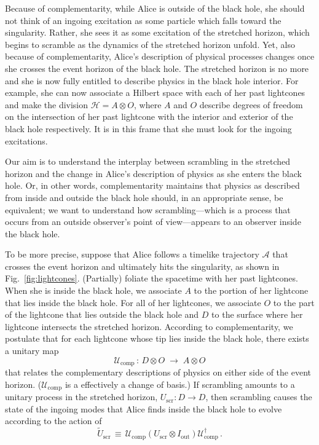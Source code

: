 \documentclass[a4paper,11pt]{article}
\newcommand{\hil}{\mathcal{H}}
\theoremstyle{definition}
\newcommand{\Fig}[1]{Fig.~\ref{#1}}
\begin{document}
Because of complementarity, while Alice is outside of the black hole, she should not think of an ingoing excitation as some particle which falls toward the singularity.
Rather, she sees it as some excitation of the stretched horizon, which begins to scramble as the dynamics of the stretched horizon unfold.
Yet, also because of complementarity, Alice's description of physical processes changes once she crosses the event horizon of the black hole.
The stretched horizon is no more and she is now fully entitled to describe physics in the black hole interior.
For example, she can now associate a Hilbert space with each of her past lightcones and make the division $\hil =  A \otimes O$, where $A$ and $O$ describe degrees of freedom on the intersection of her past lightcone with the interior and exterior of the black hole respectively.
It is in this frame that she must look for the ingoing excitations.

Our aim is to understand the interplay between scrambling in the stretched horizon and the change in Alice's description of physics as she enters the black hole.
Or, in other words, complementarity maintains that physics as described from inside and outside the black hole should, in an appropriate sense, be equivalent; we want to understand how scrambling---which is a process that occurs from an outside observer's point of view---appears to an observer inside the black hole.

To be more precise, suppose that Alice follows a timelike trajectory $\mathcal{A}$ that crosses the event horizon and ultimately hits the singularity, as shown in \Fig{fig:lightcones}.
(Partially) foliate the spacetime with her past lightcones.
  When she is inside the black hole, we associate $A$ to the portion of her lightcone that lies inside the black hole.
For all of her lightcones, we associate $O$ to the part of the lightcone that lies outside the black hole and $D$ to the surface where her lightcone intersects the stretched horizon.
According to complementarity, we postulate that for each lightcone whose tip lies inside the black hole, there exists a unitary map
\begin{equation}\label{eq:Ucomp}
\mathcal{U}_\mathrm{comp} \, : \, D \otimes O \; \longrightarrow \; A \otimes O
\end{equation}
that relates the complementary descriptions of physics on either side of the event horizon.
($\mathcal{U}_\mathrm{comp}$ is a effectively a change of basis.)
If scrambling amounts to a unitary process in the stretched horizon, $U_\mathrm{scr} : D \rightarrow D$, then scrambling causes the state of the ingoing modes that Alice finds inside the black hole to evolve according to the action of
\begin{equation} \label{eq:Uin}
\tilde U_\mathrm{scr} \, \equiv \, \mathcal{U}_\mathrm{comp} \left( U_\mathrm{scr} \otimes I_\mathrm{out} \right) \mathcal{U}_\mathrm{comp}^\dagger \, .
\end{equation}
\end{document}
